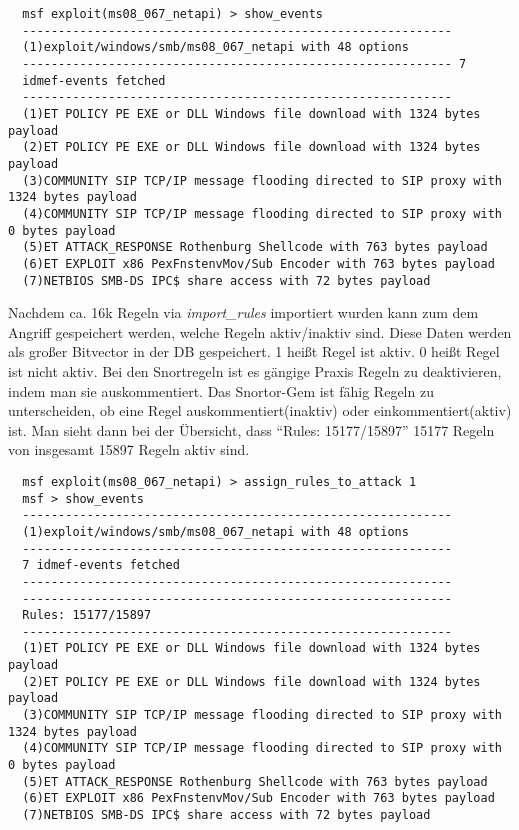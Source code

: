\begin{lstlisting}
  msf exploit(ms08_067_netapi) > show_events
  ------------------------------------------------------------
  (1)exploit/windows/smb/ms08_067_netapi with 48 options
  ------------------------------------------------------------ 7
  idmef-events fetched
  ------------------------------------------------------------
  (1)ET POLICY PE EXE or DLL Windows file download with 1324 bytes payload
  (2)ET POLICY PE EXE or DLL Windows file download with 1324 bytes payload
  (3)COMMUNITY SIP TCP/IP message flooding directed to SIP proxy with 1324 bytes payload
  (4)COMMUNITY SIP TCP/IP message flooding directed to SIP proxy with 0 bytes payload
  (5)ET ATTACK_RESPONSE Rothenburg Shellcode with 763 bytes payload
  (6)ET EXPLOIT x86 PexFnstenvMov/Sub Encoder with 763 bytes payload
  (7)NETBIOS SMB-DS IPC$ share access with 72 bytes payload
\end{lstlisting}

Nachdem ca. 16k Regeln via \textit{import\_rules} importiert wurden
kann zum dem Angriff gespeichert werden, welche Regeln aktiv/inaktiv
sind. Diese Daten werden als großer Bitvector in der DB gespeichert. 1
heißt Regel ist aktiv. 0 heißt Regel ist nicht aktiv. Bei den
Snortregeln ist es gängige Praxis Regeln zu deaktivieren, indem man
sie auskommentiert. Das Snortor-Gem ist fähig Regeln zu unterscheiden,
ob eine Regel auskommentiert(inaktiv) oder einkommentiert(aktiv)
ist. Man sieht dann bei der Übersicht, dass \enquote{Rules: 15177/15897}
15177 Regeln von insgesamt 15897 Regeln aktiv sind.

\begin{lstlisting}
  msf exploit(ms08_067_netapi) > assign_rules_to_attack 1
  msf > show_events
  ------------------------------------------------------------
  (1)exploit/windows/smb/ms08_067_netapi with 48 options
  ------------------------------------------------------------
  7 idmef-events fetched
  ------------------------------------------------------------
  ------------------------------------------------------------
  Rules: 15177/15897
  ------------------------------------------------------------
  (1)ET POLICY PE EXE or DLL Windows file download with 1324 bytes payload
  (2)ET POLICY PE EXE or DLL Windows file download with 1324 bytes payload
  (3)COMMUNITY SIP TCP/IP message flooding directed to SIP proxy with 1324 bytes payload
  (4)COMMUNITY SIP TCP/IP message flooding directed to SIP proxy with 0 bytes payload
  (5)ET ATTACK_RESPONSE Rothenburg Shellcode with 763 bytes payload
  (6)ET EXPLOIT x86 PexFnstenvMov/Sub Encoder with 763 bytes payload
  (7)NETBIOS SMB-DS IPC$ share access with 72 bytes payload
\end{lstlisting}

